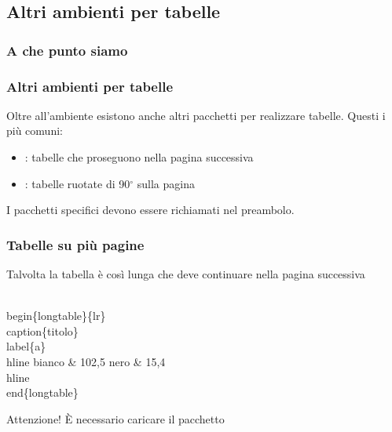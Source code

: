 \documentclass[svgnames,%
	ucs,%
	pdftex]{guitbeamer}
\begin{document}
\subsection{Altri ambienti per tabelle}
\begin{frame}
  \frametitle{A che punto siamo}
\end{frame}
\begin{frame}
  \frametitle{Altri ambienti per tabelle}
	Oltre all'ambiente  esistono anche altri pacchetti per realizzare tabelle. Questi i pi\`u comuni:
	\begin{itemize}
		\item {}: tabelle che proseguono nella pagina successiva
		\item {}: tabelle ruotate di 90$^{\circ}$ sulla pagina
	\end{itemize}
	I pacchetti specifici devono essere richiamati nel preambolo.
\end{frame}
\begin{frame}
  \frametitle{Tabelle su pi\`u pagine}
	Talvolta la tabella \`e cos\`i lunga che deve continuare nella pagina successiva
	\begin{LaTeXcode}
		\alert{\\begin\{longtable\}\{lr\}}\n
		\\caption\{titolo\}\\label\{a\}\
		\\hline\n
		\hspace*{5ex}bianco \& 102,5 \bs\bs\n
		\hspace*{5ex}nero   \& 15,4 \bs\bs\
		\\hline\n
		\alert{\\end\{longtable\}}
	\end{LaTeXcode}
	\begin{block}{Attenzione!}
		\`E necessario caricare il pacchetto 
	\end{block}
\end{frame}
\end{document}
